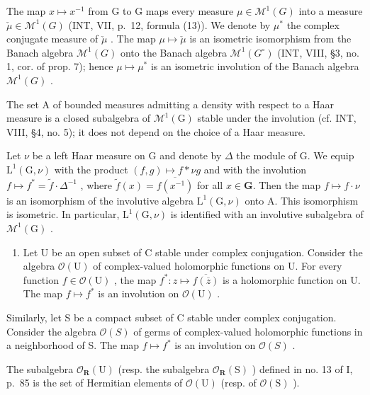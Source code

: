 The map \(x \mapsto x^{-1}\) from G to G maps every measure \(\mu \in \mathcal{M}^{1}(G)\) into a measure \(\check{\mu} \in \mathcal{M}^{1}(G)\) (INT, VII, p.~12, formula (13)). We denote by \(\mu^{*}\) the complex conjugate measure of \(\check{\mu}\) . The map \(\mu \mapsto \check{\mu}\) is an isometric isomorphism from the Banach algebra \(\mathcal{M}^{1}(G)\) onto the Banach algebra \(\mathcal{M}^{1}(G^{\circ})\) (INT, VIII, §3, no. 1, cor. of prop. 7); hence \(\mu \mapsto \mu^{*}\) is an isometric involution of the Banach algebra \(\mathcal{M}^{1}(G)\) .

The set A of bounded measures admitting a density with respect to a Haar measure is a closed subalgebra of \(\mathcal{M}^{1}(\mathrm{G})\) stable under the involution (cf. INT, VIII, §4, no. 5); it does not depend on the choice of a Haar measure.

Let \(\nu\) be a left Haar measure on G and denote by \(\Delta\) the module of G. We equip \(\mathrm{L}^1 (\mathrm{G},\nu)\) with the product \((f,g)\mapsto f*\nu g\) and with the involution \(f\mapsto f^{*} = \widetilde{f}\cdot \Delta^{-1}\) , where \(\widetilde{f} (x) = \overline{f(x^{-1})}\) for all \(x\in \mathbf{G}\). Then the map \(f\mapsto f\cdot \nu\) is an isomorphism of the involutive algebra \(\mathrm{L}^1 (\mathrm{G},\nu)\) onto A. This isomorphism is isometric. In particular, \(\mathrm{L}^1 (\mathrm{G},\nu)\) is identified with an involutive subalgebra of \(\mathcal{M}^1 (\mathrm{G})\) .

\begin{enumerate}
\def\labelenumi{\arabic{enumi})}
\setcounter{enumi}{4}
\tightlist
\item
  Let U be an open subset of C stable under complex conjugation. Consider the algebra \(\mathcal{O}(\mathrm{U})\) of complex-valued holomorphic functions on U. For every function \(f \in \mathcal{O}(\mathrm{U})\) , the map \(f^{*}: z \mapsto \overline{f(\overline{z})}\) is a holomorphic function on U. The map \(f \mapsto f^{*}\) is an involution on \(\mathcal{O}(\mathrm{U})\) .
\end{enumerate}

Similarly, let S be a compact subset of C stable under complex conjugation. Consider the algebra \(\mathcal{O}(S)\) of germs of complex-valued holomorphic functions in a neighborhood of S. The map \(f \mapsto f^{*}\) is an involution on \(\mathcal{O}(S)\) .

The subalgebra \(\mathcal{O}_{\mathbf{R}}(\mathrm{U})\) (resp. the subalgebra \(\mathcal{O}_{\mathbf{R}}(\mathrm{S})\) ) defined in no. 13 of I, p.~85 is the set of Hermitian elements of \(\mathcal{O}(\mathrm{U})\) (resp. of \(\mathcal{O}(\mathrm{S})\) ).

